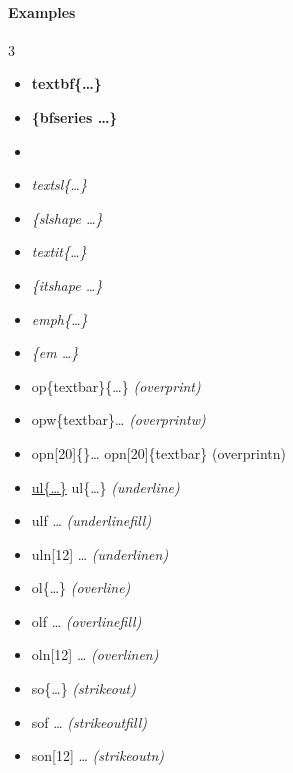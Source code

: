\documentclass[english,12pt,openany,letterpaper]{book}
\begin{document}
\break

\paragraph{Examples}

\vspace*{-2ex}

\begin{multicols}{3}
\begin{itemize}
	\item \textbf{\bs textbf\{\ldots\}}
	\item {\bfseries \{\bs bfseries \ldots\}}
	\item {}
	\item \textsl{\bs textsl\{\ldots\}}
	\item {\slshape \{\bs slshape \ldots\}}
	\item \textit{\bs textit\{\ldots\}}
	\item {\itshape \{\bs itshape \ldots\}}
	\item \emph{\bs emph\{\ldots\}}
	\item {\em \{\bs em \ldots\}}
\end{itemize}
\end{multicols}

\begin{itemize}
	\item {} \tab \bs op\{\bs textbar\}\{\ldots\} \tab \textit{(\bs overprint)}
	\item \opw{\textbar}\bs opw\{\bs textbar\}\ldots {} \textit{(\bs overprintw)}
	\item \opn[20]{\textbar}\bs opn[20]\{\textbar\}\ldots {} \bs opn[20]\{\bs textbar\} \tab (\bs overprintn)
	\item \ul{\bs ul\{\ldots\}} \tab\bs ul\{\ldots\} \tab \textit{(\bs underline)}
	\item \ulf \bs ulf \ldots {} \textit{(\bs underlinefill)}
	\item \uln[16]\bs uln[12] \ldots {} \textit{(\bs underlinen)}
	\item {} \tab\bs ol\{\ldots\} \tab \textit{(\bs overline)}
	\item \olf \bs olf \ldots {} \textit{(\bs overlinefill)}
	\item \oln[16]\bs oln[12] \ldots {} \textit{(\bs overlinen)}
	\item {} \tab\bs so\{\ldots\} \tab \textit{(\bs strikeout)}
	\item \sof \bs sof \ldots {} \textit{(\bs strikeoutfill)}
	\item \son[16]\bs son[12] \ldots {} \textit{(\bs strikeoutn)}
\end{itemize}
\end{document}
